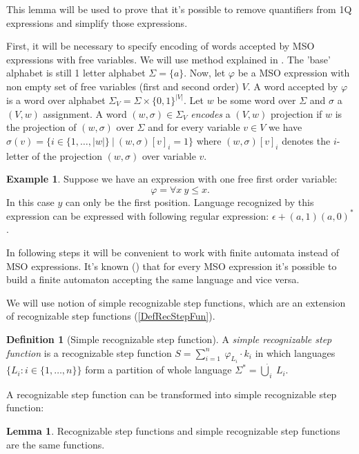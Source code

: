 \documentclass[12pt]{article}
\theoremstyle{definition}
\newtheorem{definition}{Definition}[section]
\newtheorem{lemma}[theorem]{Lemma}
\newtheorem{example}{Example}[section]
\begin{document}
This lemma will be used to prove that it's possible to remove quantifiers from 1Q expressions and simplify those expressions. 

First, it will be necessary to specify encoding of words accepted by MSO expressions with free variables. We will use method explained in \cite{KreutzerR13}. The 'base' alphabet is still 1 letter alphabet $\Sigma = \{a\}$. Now, let $\varphi$ be a MSO expression with non empty set of free variables (first and second order) $V$. A word accepted by $\varphi$ is a word over alphabet $\Sigma_V = \Sigma \times \{0, 1\}^{|V|}$. Let $w$ be some word over $\Sigma$ and $\sigma$ a $(V, w)$ assignment. A word $(w, \sigma) \in \Sigma_V$ \textit{encodes} a $(V, w)$ projection if $w$ is the projection of $(w, \sigma)$ over $\Sigma$ and for every variable $v \in V$ we have $\sigma(v) = \{i \in \{1,\ldots,|w|\} \ | \ (w, \sigma)[v]_i = 1 \}$ where $(w, \sigma)[v]_i$ denotes the $i$-letter of the projection $(w, \sigma)$ over variable $v$.

\begin{example}
    Suppose we have an expression with one free first order variable:
    $$\varphi = \forall x \ y \leq x.$$
    In this case $y$ can only be the first position. Language recognized by this expression can be expressed with following regular expression: $\epsilon + (a,1)(a,0)^*$.
\end{example}

In following steps it will be convenient to work with finite automata instead of MSO expressions. It's known (\cite{Buchi1960}) that for every MSO expression it's possible to build a finite automaton accepting the same language and vice versa.

We will use notion of simple recognizable step functions, which are an extension of recognizable step functions (\ref{DefRecStepFun}).

\begin{definition}[Simple recognizable step function]
    \label{DefSimpleRecStepFun}
    A \textit{simple recognizable step function} is a recognizable step function $S = \sum_{i = 1}^{n} \ \varphi_{L_i} \cdot k_i$ in which languages $\{L_i : i \in \{1,\ldots,n\}\}$ form a partition of whole language $\Sigma^* = \dot{\bigcup}_i \ L_i$.
\end{definition}

A recognizable step function can be transformed into simple recognizable step function:

\begin{lemma}
    \label{RecEqSimpleRec}
    Recognizable step functions and simple recognizable step functions are the same functions.
\end{lemma}
\end{document}
